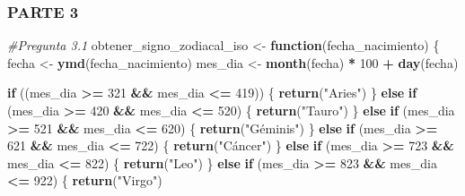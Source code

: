 \documentclass[
]{article}
\newenvironment{Shaded}{\begin{snugshade}}{\end{snugshade}}
\newcommand{\CommentTok}[1]{\textcolor[rgb]{0.56,0.35,0.01}{\textit{#1}}}
\newcommand{\ControlFlowTok}[1]{\textcolor[rgb]{0.13,0.29,0.53}{\textbf{#1}}}
\newcommand{\DecValTok}[1]{\textcolor[rgb]{0.00,0.00,0.81}{#1}}
\newcommand{\FunctionTok}[1]{\textcolor[rgb]{0.13,0.29,0.53}{\textbf{#1}}}
\newcommand{\NormalTok}[1]{#1}
\newcommand{\OtherTok}[1]{\textcolor[rgb]{0.56,0.35,0.01}{#1}}
\newcommand{\SpecialCharTok}[1]{\textcolor[rgb]{0.81,0.36,0.00}{\textbf{#1}}}
\newcommand{\StringTok}[1]{\textcolor[rgb]{0.31,0.60,0.02}{#1}}
\begin{document}
\hypertarget{parte-3}{%
\subsubsection{PARTE 3}\label{parte-3}}

\begin{Shaded}
\begin{Highlighting}[]
\CommentTok{\#Pregunta 3.1}
\NormalTok{obtener\_signo\_zodiacal\_iso }\OtherTok{\textless{}{-}} \ControlFlowTok{function}\NormalTok{(fecha\_nacimiento) \{}
\NormalTok{  fecha }\OtherTok{\textless{}{-}} \FunctionTok{ymd}\NormalTok{(fecha\_nacimiento)}
\NormalTok{  mes\_dia }\OtherTok{\textless{}{-}} \FunctionTok{month}\NormalTok{(fecha) }\SpecialCharTok{*} \DecValTok{100} \SpecialCharTok{+} \FunctionTok{day}\NormalTok{(fecha)}
  
  \ControlFlowTok{if}\NormalTok{ ((mes\_dia }\SpecialCharTok{\textgreater{}=} \DecValTok{321} \SpecialCharTok{\&\&}\NormalTok{ mes\_dia }\SpecialCharTok{\textless{}=} \DecValTok{419}\NormalTok{)) \{}
    \FunctionTok{return}\NormalTok{(}\StringTok{"Aries"}\NormalTok{)}
\NormalTok{  \} }\ControlFlowTok{else} \ControlFlowTok{if}\NormalTok{ (mes\_dia }\SpecialCharTok{\textgreater{}=} \DecValTok{420} \SpecialCharTok{\&\&}\NormalTok{ mes\_dia }\SpecialCharTok{\textless{}=} \DecValTok{520}\NormalTok{) \{}
    \FunctionTok{return}\NormalTok{(}\StringTok{"Tauro"}\NormalTok{)}
\NormalTok{  \} }\ControlFlowTok{else} \ControlFlowTok{if}\NormalTok{ (mes\_dia }\SpecialCharTok{\textgreater{}=} \DecValTok{521} \SpecialCharTok{\&\&}\NormalTok{ mes\_dia }\SpecialCharTok{\textless{}=} \DecValTok{620}\NormalTok{) \{}
    \FunctionTok{return}\NormalTok{(}\StringTok{"Géminis"}\NormalTok{)}
\NormalTok{  \} }\ControlFlowTok{else} \ControlFlowTok{if}\NormalTok{ (mes\_dia }\SpecialCharTok{\textgreater{}=} \DecValTok{621} \SpecialCharTok{\&\&}\NormalTok{ mes\_dia }\SpecialCharTok{\textless{}=} \DecValTok{722}\NormalTok{) \{}
    \FunctionTok{return}\NormalTok{(}\StringTok{"Cáncer"}\NormalTok{)}
\NormalTok{  \} }\ControlFlowTok{else} \ControlFlowTok{if}\NormalTok{ (mes\_dia }\SpecialCharTok{\textgreater{}=} \DecValTok{723} \SpecialCharTok{\&\&}\NormalTok{ mes\_dia }\SpecialCharTok{\textless{}=} \DecValTok{822}\NormalTok{) \{}
    \FunctionTok{return}\NormalTok{(}\StringTok{"Leo"}\NormalTok{)}
\NormalTok{  \} }\ControlFlowTok{else} \ControlFlowTok{if}\NormalTok{ (mes\_dia }\SpecialCharTok{\textgreater{}=} \DecValTok{823} \SpecialCharTok{\&\&}\NormalTok{ mes\_dia }\SpecialCharTok{\textless{}=} \DecValTok{922}\NormalTok{) \{}
    \FunctionTok{return}\NormalTok{(}\StringTok{"Virgo"}\NormalTok{)}

\end{Highlighting}
\end{Shaded}
\end{document}
